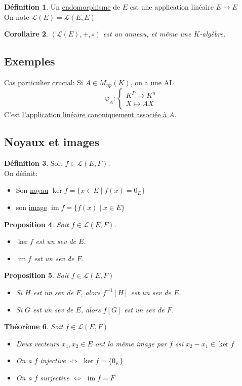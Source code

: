 \documentclass[10pt,a4paper]{article}
\theoremstyle{plain}
\newtheorem{proposition}{Proposition}[section]
\newtheorem{theorem}[proposition]{Théorème}
\newtheorem{corollaire}[proposition]{Corollaire}
\theoremstyle{definition}
\newtheorem{definition}[proposition]{Définition}
\DeclareMathOperator{\im}{im}
\begin{document}
\begin{definition}
Un \uline{endomorphisme} de $E$ est une application linéaire $E \to E$ \\
On note $\mathcal{L}(E) = \mathcal{L}(E, E)$
\end{definition}
\begin{corollaire}
$(\mathcal{L}(E), +, \circ)$ est un anneau, et même une $K$-algèbre.
\end{corollaire}

\subsection{Exemples}
\uline{Cas particulier crucial}: Si $A \in M_{np}(K)$, on a une AL
\[\varphi_A: \begin{cases}
K^P \to K^n \\
X \mapsto AX
\end{cases}\]
C'est \uline{l'application linéaire canoniquement associée à $A$}.

\subsection{Noyaux et images}
\begin{definition}
Soit $f \in \mathcal{L}(E, F)$. \\
On définit:
\begin{itemize}
\item Son \uline{noyau} $\ker f = \{ x \in E \mid f(x) = 0_E \}$
\item son \uline{image} $\im f = \{ f(x) \mid x \in E \}$
\end{itemize}
\end{definition}
\begin{proposition}
Soit $f \in \mathcal{L}(E, F)$.
\begin{itemize}
\item $\ker f$ est un sev de $E$.
\item $\im f$ est un sev de $F$.
\end{itemize}
\end{proposition}
\begin{proposition}
Soit $f \in \mathcal{L}(E, F)$
\begin{itemize}
\item Si $H$ est un sev de $F$, alors $f^{-1}[H]$ est un sev de $E$.
\item Si $G$ est un sev de $E$, alors $f[G]$ est un sev de $F$.
\end{itemize}
\end{proposition}
\begin{theorem}
Soit $f \in \mathcal{L}(E, F)$
\begin{itemize}
\item Deux vecteurs $x_1, x_2 \in E$ ont la même image par $f$ ssi $x_2 - x_1 \in \ker f$
\item On a $f$ injective $\iff$ $\ker f = \{ 0_E \}$
\item On a $f$ surjective $\iff$ $\im f = F$
\end{itemize}
\end{theorem}
\end{document}
